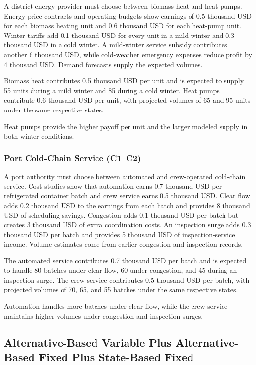 	A district energy provider must choose between biomass heat and heat pumps. Energy-price contracts and operating budgets show earnings of 0.5 thousand USD for each biomass heating unit and 0.6 thousand USD for each heat-pump unit. Winter tariffs add 0.1 thousand USD for every unit in a mild winter and 0.3 thousand USD in a cold winter. A mild-winter service subsidy contributes another 6 thousand USD, while cold-weather emergency expenses reduce profit by 4 thousand USD. Demand forecasts supply the expected volumes.
	
	Biomass heat contributes 0.5 thousand USD per unit and is expected to supply 55 units during a mild winter and 85 during a cold winter. Heat pumps contribute 0.6 thousand USD per unit, with projected volumes of 65 and 95 units under the same respective states.
	
	Heat pumps provide the higher payoff per unit and the larger modeled supply in both winter conditions.
	
	\subsubsection{Port Cold-Chain Service (C1--C2)}
	\label{sec:problem29-port-cold-chain-service-c1-c2}
	
	A port authority must choose between automated and crew-operated cold-chain service. Cost studies show that automation earns 0.7 thousand USD per refrigerated container batch and crew service earns 0.5 thousand USD. Clear flow adds 0.2 thousand USD to the earnings from each batch and provides 8 thousand USD of scheduling savings. Congestion adds 0.1 thousand USD per batch but creates 3 thousand USD of extra coordination costs. An inspection surge adds 0.3 thousand USD per batch and provides 5 thousand USD of inspection-service income. Volume estimates come from earlier congestion and inspection records.
	
	The automated service contributes 0.7 thousand USD per batch and is expected to handle 80 batches under clear flow, 60 under congestion, and 45 during an inspection surge. The crew service contributes 0.5 thousand USD per batch, with projected volumes of 70, 65, and 55 batches under the same respective states.
	
	 Automation handles more batches under clear flow, while the crew service maintains higher volumes under congestion and inspection surges.

	
	\subsection{Alternative-Based Variable Plus Alternative-Based Fixed Plus State-Based Fixed}
	\label{sec:alternative-based-variable-payoff-plus-alternative-based-fixed-payoff-plus-state-based-fixed-payoff}

